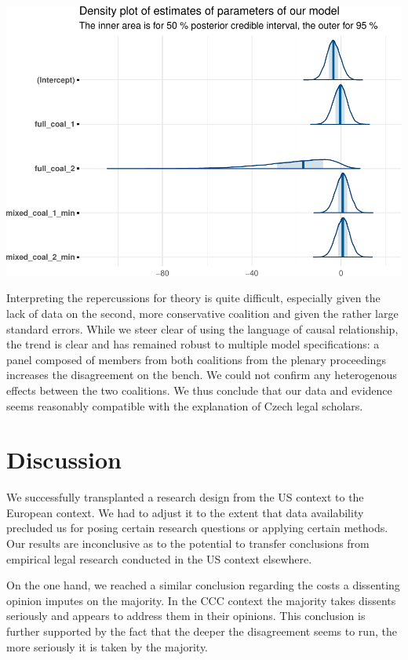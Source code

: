 \documentclass[
  11pt,
]{article}
\begin{document}
\includegraphics{dissents_article_files/figure-latex/interval_coalition-1.pdf}

Interpreting the repercussions for theory is quite difficult, especially
given the lack of data on the second, more conservative coalition and
given the rather large standard errors. While we steer clear of using
the language of causal relationship, the trend is clear and has remained
robust to multiple model specifications: a panel composed of members
from both coalitions from the plenary proceedings increases the
disagreement on the bench. We could not confirm any heterogenous effects
between the two coalitions. We thus conclude that our data and evidence
seems reasonably compatible with the explanation of Czech legal
scholars.

\hypertarget{discussion}{%
\section{Discussion}\label{discussion}}

We successfully transplanted a research design from the US context to
the European context. We had to adjust it to the extent that data
availability precluded us for posing certain research questions or
applying certain methods. Our results are inconclusive as to the
potential to transfer conclusions from empirical legal research
conducted in the US context elsewhere.

On the one hand, we reached a similar conclusion regarding the costs a
dissenting opinion imputes on the majority. In the CCC context the
majority takes dissents seriously and appears to address them in their
opinions. This conclusion is further supported by the fact that the
deeper the disagreement seems to run, the more seriously it is taken by
the majority.
\end{document}
